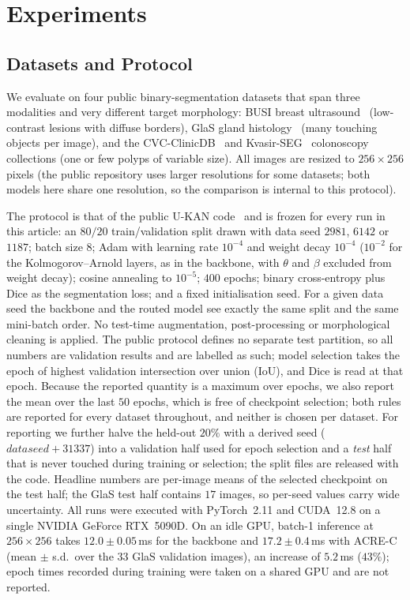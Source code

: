 \section{Experiments}
\label{sec:experiments}

\subsection{Datasets and Protocol}
\label{sec:protocol}

We evaluate on four public binary-segmentation datasets that span three modalities and very different target morphology: BUSI breast ultrasound~\cite{aldhabyani2020busi} (low-contrast lesions with diffuse borders), GlaS gland histology~\cite{sirinukunwattana2017glas} (many touching objects per image), and the CVC-ClinicDB~\cite{bernal2015cvc} and Kvasir-SEG~\cite{jha2020kvasir} colonoscopy collections (one or few polyps of variable size). All images are resized to $256\times256$ pixels (the public repository uses larger resolutions for some datasets; both models here share one resolution, so the comparison is internal to this protocol).

The protocol is that of the public U-KAN code~\cite{li2025ukan} and is frozen for every run in this article: an $80/20$ train/validation split drawn with data seed $2981$, $6142$ or $1187$; batch size $8$; Adam with learning rate $10^{-4}$ and weight decay $10^{-4}$ ($10^{-2}$ for the Kolmogorov--Arnold layers, as in the backbone, with $\theta$ and $\beta$ excluded from weight decay); cosine annealing to $10^{-5}$; $400$ epochs; binary cross-entropy plus Dice as the segmentation loss; and a fixed initialisation seed. For a given data seed the backbone and the routed model see exactly the same split and the same mini-batch order. No test-time augmentation, post-processing or morphological cleaning is applied. The public protocol defines no separate test partition, so all numbers are validation results and are labelled as such; model selection takes the epoch of highest validation intersection over union (IoU), and Dice is read at that epoch. Because the reported quantity is a maximum over epochs, we also report the mean over the last $50$ epochs, which is free of checkpoint selection; both rules are reported for every dataset throughout, and neither is chosen per dataset. For reporting we further halve the held-out $20\%$ with a derived seed ($\mathit{dataseed}+31337$) into a validation half used for epoch selection and a \emph{test} half that is never touched during training or selection; the split files are released with the code. Headline numbers are per-image means of the selected checkpoint on the test half; the GlaS test half contains $17$ images, so per-seed values carry wide uncertainty. All runs were executed with PyTorch~2.11 and CUDA~12.8 on a single NVIDIA GeForce RTX~5090D. On an idle GPU, batch-1 inference at $256\times256$ takes $12.0\pm0.05$\,ms for the backbone and $17.2\pm0.4$\,ms with ACRE-C (mean $\pm$ s.d.\ over the $33$ GlaS validation images), an increase of $5.2$\,ms ($43\%$); epoch times recorded during training were taken on a shared GPU and are not reported.

